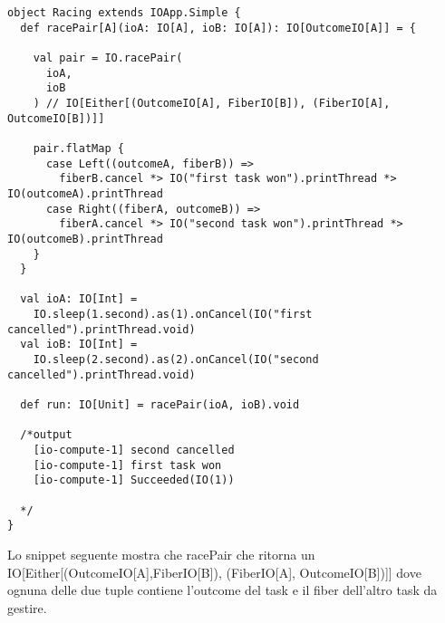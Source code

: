 \begin{verbatim}
object Racing extends IOApp.Simple {
  def racePair[A](ioA: IO[A], ioB: IO[A]): IO[OutcomeIO[A]] = {

    val pair = IO.racePair(
      ioA,
      ioB
    ) // IO[Either[(OutcomeIO[A], FiberIO[B]), (FiberIO[A], OutcomeIO[B])]]

    pair.flatMap {
      case Left((outcomeA, fiberB)) =>
        fiberB.cancel *> IO("first task won").printThread *> IO(outcomeA).printThread
      case Right((fiberA, outcomeB)) =>
        fiberA.cancel *> IO("second task won").printThread *> IO(outcomeB).printThread
    }
  }

  val ioA: IO[Int] =
    IO.sleep(1.second).as(1).onCancel(IO("first cancelled").printThread.void)
  val ioB: IO[Int] =
    IO.sleep(2.second).as(2).onCancel(IO("second cancelled").printThread.void)

  def run: IO[Unit] = racePair(ioA, ioB).void

  /*output
    [io-compute-1] second cancelled
    [io-compute-1] first task won
    [io-compute-1] Succeeded(IO(1))

  */
}

\end{verbatim}

Lo snippet seguente mostra che racePair che ritorna un IO[Either[(OutcomeIO[A],FiberIO[B]), (FiberIO[A], OutcomeIO[B])]] dove ognuna delle due tuple contiene
l’outcome del task e il fiber dell’altro task da gestire.
